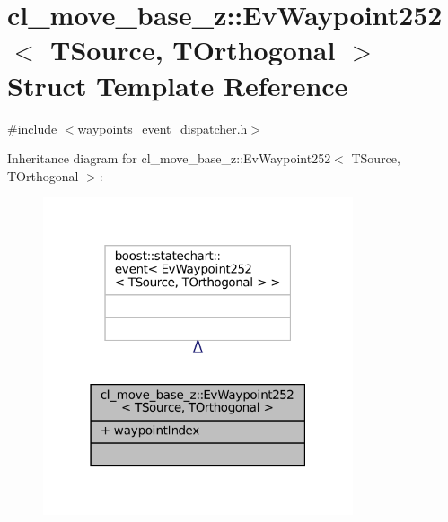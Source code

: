 \hypertarget{structcl__move__base__z_1_1EvWaypoint252}{}\section{cl\+\_\+move\+\_\+base\+\_\+z\+:\+:Ev\+Waypoint252$<$ T\+Source, T\+Orthogonal $>$ Struct Template Reference}
\label{structcl__move__base__z_1_1EvWaypoint252}


{\ttfamily \#include $<$waypoints\+\_\+event\+\_\+dispatcher.\+h$>$}



Inheritance diagram for cl\+\_\+move\+\_\+base\+\_\+z\+:\+:Ev\+Waypoint252$<$ T\+Source, T\+Orthogonal $>$\+:
\nopagebreak
\begin{figure}[H]
\begin{center}
\leavevmode
\includegraphics[width=259pt]{structcl__move__base__z_1_1EvWaypoint252__inherit__graph}
\end{center}
\end{figure}


